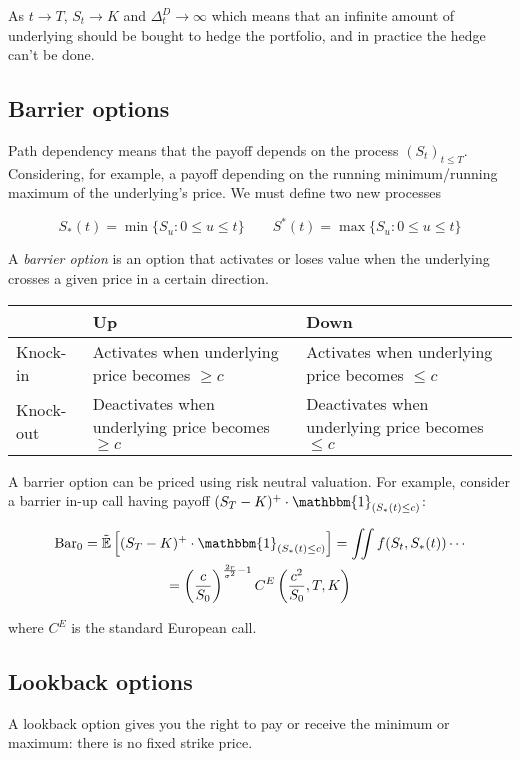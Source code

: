 \documentclass[oneside,titlepage,headinclude,12pt,a4paper,BCOR5mm,footinclude]{book}
\theoremstyle{defn}
\newcommand{\rnE}[1]{\mathbb{\tilde E}\left[ {#1} \right]}
\begin{document}
As  $t \to  T$, $S_t  \to K$  and $\Delta^D_t  \to \infty$  which means  that an
infinite amount  of underlying should be  bought to hedge the  portfolio, and in
practice the hedge can't be done.

\subsection{Barrier options}

Path dependency means that the payoff depends on the process $(S_t)_{t \leq T}$.
Considering, for example, a payoff depending on the running minimum/running maximum
of the underlying's price. We must define two new processes

\[
  S_*(t) = \min\{S_u : 0 \leq u \leq t\} \quad\quad
  S^*(t) = \max\{S_u : 0 \leq u \leq t\}
\]

A \textit{barrier option} is an option that activates or loses value when the
underlying crosses a given price in a certain direction.

\begin{tabular}{p{}|p{}|p{}}
  & Up & Down \\
  \hline Knock-in & Activates when underlying price becomes $\geq c$ & Activates when underlying price becomes $\leq c$ \\
  \hline Knock-out & Deactivates when underlying price becomes $\geq c$& Deactivates when underlying price becomes $\leq c$
\end{tabular}

A   barrier   option    can   be   priced   using    risk   neutral   valuation.
For    example,    consider    a    barrier    in-up    call    having    payoff
$(S_T-K)^+\cdot\mathbbm{1}_{(S_*(t)\leq c)}$:

\begin{gather*}
  \text{Bar}_0 = \rnE{(S_T-K)^+\cdot\mathbbm{1}_{(S_*(t)\leq c)}}
  = \iint f(S_t,S_*(t)) \cdots \\= \left(\frac{c}{S_0}\right)^{\frac{2r}{\sigma^2}-1}
  C^E\left(\frac{c^2}{S_0},T,K\right)
\end{gather*}

where $C^E$ is the standard European call.

\subsection{Lookback options}

A lookback option gives you the right to pay or receive the minimum or maximum:
there is no fixed strike price.
\end{document}
